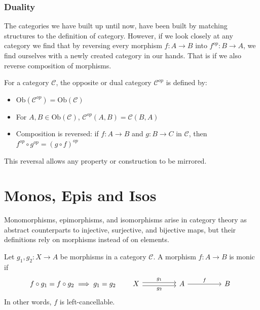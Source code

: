 


\subsubsection{\centering Duality}
\label{sec:duality}

The categories we have built up until now, have been built by matching structures to the definition of category. However, if we look closely at any category we find that by reversing every morphism $f : A \to B$ into $f^{op} : B \to A$, we find ourselves with a newly created category in our hands. That is if we also reverse composition of morphisms.

\begin{definition} For a category $\mathcal{C}$, the opposite or dual category $\mathcal{C}^{op}$ is defined by:
  \begin{itemize}
  \item $\mathrm{Ob}(\mathcal{C}^{op}) = \mathrm{Ob}(\mathcal{C})$
  \item For $A,B \in \mathrm{Ob}(\mathcal{C})$, $\mathcal{C}^{op}(A,B) = \mathcal{C}(B,A)$
  \item Composition is reversed: if $f : A \to B$ and $g : B \to C$ in $\mathcal{C}$, then
    \(
    f^{op} \circ g^{op} = (g \circ f)^{op}
    \)
  \end{itemize}
  This reversal allows any property or construction to be mirrored.
\end{definition}

\section{\centering Monos, Epis and Isos}

Monomorphisms, epimorphisms, and isomorphisms arise in category theory as abstract counterparts to injective, surjective, and bijective maps, but their definitions rely on morphisms instead of on elements.

\begin{definition}
  \label{def:monomorphism}
  Let \( g_1, g_2 : X \to A \) be morphisms in a category \(\mathcal{C}\).  
  A morphism \( f : A \to B \) is monic if
  \[
    f \circ g_1 = f \circ g_2 \implies g_1 = g_2
    \qquad
    \begin{tikzcd}[row sep=huge, column sep=huge]
      X \arrow[r, shift left=0.5ex, "g_1"] 
      \arrow[r, shift right=0.5ex, swap, "g_2"] 
      & A \arrow[r, "f"] & B
    \end{tikzcd}
  \]
  In other words, \(f\) is left-cancellable.

\end{definition}

